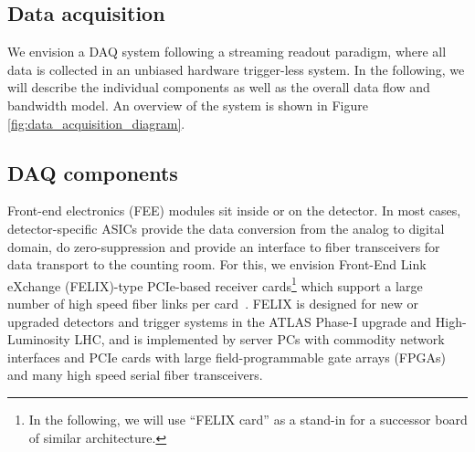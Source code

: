
\subsection{Data acquisition}

We envision a DAQ system following a streaming readout paradigm, where all data is collected in an unbiased hardware trigger-less system. In the following, we will describe the individual components as well as the overall data flow and bandwidth model. An overview of the system is shown in Figure \ref{fig:data_acquisition_diagram}.


\begin{figure*}[th]
 \begin{center}
  
  
  \caption[Data Acquisition Diagram]{\label{fig:data_acquisition_diagram} The DAQ electronics deployment can be roughly divided by their location, with Front End Electronics (FEE) modules on/near the detector; Front End Processor boards (FEP) which digitize or reformat detector information and Stream Aggregator Boards (SAB), which bundle streams, in the hall; and online filtering and monitoring in the counting room. Long term storage and analysis processing is performed in a federated model on multiple sites. }
 \end{center}
\end{figure*}


\subsection{DAQ components}
 Front-end electronics (FEE) modules sit inside or on the detector. In most cases, detector-specific ASICs provide the data conversion from the analog to digital domain, do zero-suppression and provide an interface to fiber transceivers for data transport to the counting room. For this, we envision Front-End Link eXchange (FELIX)-type PCIe-based receiver cards\footnote{In the following, we will use ``FELIX card'' as a stand-in for a successor board of similar architecture.} which support a large number of high speed fiber links per card~\cite{Chen:2019owc}. FELIX is designed for new or upgraded detectors and trigger systems in the ATLAS Phase-I upgrade and High-Luminosity LHC, and is implemented by server PCs with commodity network interfaces and PCIe cards with large field-programmable gate arrays (FPGAs) and many high speed serial fiber transceivers. 

